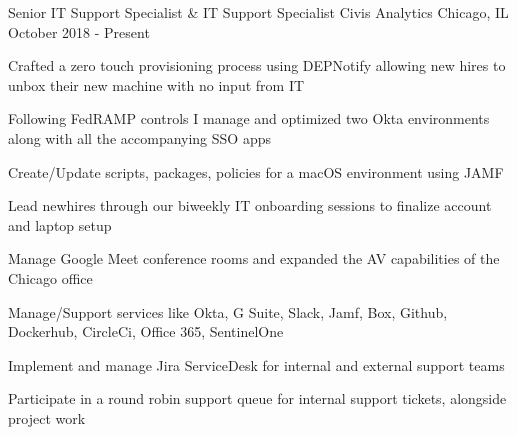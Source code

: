 

\begin{cventries}

  \cventry
  {Senior IT Support Specialist \& IT Support Specialist} %
  {Civis Analytics} %
  {Chicago, IL} %
  {October 2018 - Present} %
  {
    \begin{cvitems} %
      \item {Crafted a zero touch provisioning process using DEPNotify allowing new hires to unbox their new machine with no input from IT}
      \item {Following FedRAMP controls I manage and optimized two Okta environments along with all the accompanying SSO apps}
      \item {Create/Update scripts, packages, policies for a macOS environment using JAMF}
      \item {Lead newhires through our biweekly IT onboarding sessions to finalize account and laptop setup}
      \item {Manage Google Meet conference rooms and expanded the AV capabilities of the Chicago office}      
      \item {Manage/Support services like Okta, G Suite, Slack, Jamf, Box, Github, Dockerhub, CircleCi, Office 365, SentinelOne}
      \item {Implement and manage Jira ServiceDesk for internal and external support teams}
      \item {Participate in a round robin support queue for internal support tickets, alongside project work}
    \end{cvitems}
  }


\end{cventries}
